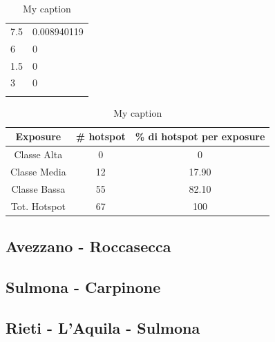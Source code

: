 \begin{longtable}{|l|l|}
	\rowcolor[HTML]{32CB00} 
	7.5                                                     & 0.008940119                                                   \\
	\rowcolor[HTML]{32CB00} 
	6                                                       & 0                                                             \\
	\rowcolor[HTML]{32CB00} 
	1.5                                                     & 0                                                             \\
	\rowcolor[HTML]{32CB00} 
	3                                                       & 0                                                                                                        \\ \hline
	\caption{My caption}
	\label{my-label1}
\end{longtable}

\begin{table}[H]
	\centering
	\caption{My caption}
	\label{risultati_roma_pescara}
	\begin{tabular}{|c|c|c|}
		\hline
		\rowcolor[HTML]{C0C0C0} 
		\textbf{Exposure} & \textbf{\# hotspot} & \textbf{\% di hotspot per exposure} \\ \hline
		Classe Alta       & 0                  & 0                                   \\ \hline
		Classe Media      & 12                 & 17.90                            \\ \hline
		Classe Bassa      & 55               & 82.10                               \\ \hline
		Tot. Hotspot      & 67               & 100                                 \\ \hline
	\end{tabular}
\end{table}


\subsection{Avezzano - Roccasecca}

\subsection{Sulmona - Carpinone}

\subsection{Rieti - L'Aquila - Sulmona}

